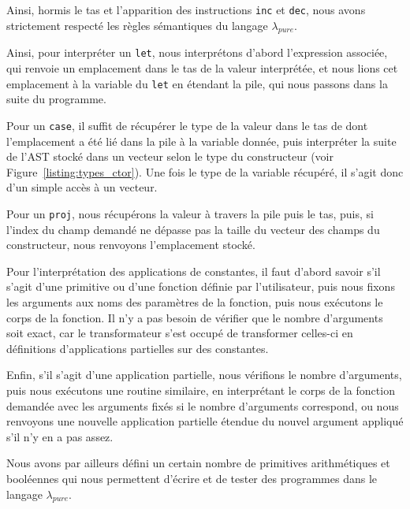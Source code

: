 \documentclass{rapportECL}
\begin{document}
Ainsi, hormis le tas et l'apparition des instructions \verb|inc| et \verb|dec|, nous avons strictement respecté les règles sémantiques du langage $\lambda_{pure}$.

\medskip

Ainsi, pour interpréter un \verb|let|, nous interprétons d'abord l'expression associée, qui renvoie un emplacement dans le tas
de la valeur interprétée, et nous lions cet emplacement à la variable du \verb|let| en étendant la pile, qui nous passons dans 
la suite du programme.

\medskip

Pour un \verb|case|, il suffit de récupérer le type de la valeur dans le tas de dont l'emplacement a été lié dans la pile à la variable 
donnée, puis interpréter la suite de l'AST stocké dans un vecteur selon le type du constructeur (voir Figure~\ref{listing:types_ctor}).
Une fois le type de la variable récupéré, il s'agit donc d'un simple accès à un vecteur.

\medskip

Pour un \verb|proj|, nous récupérons la valeur à travers la pile puis le tas, puis, si l'index du champ demandé ne dépasse pas la 
taille du vecteur des champs du constructeur, nous renvoyons l'emplacement stocké.

\medskip

Pour l'interprétation des applications de constantes, il faut d'abord savoir s'il s'agit d'une primitive ou d'une fonction 
définie par l'utilisateur, puis nous fixons les arguments aux noms des paramètres de la fonction, puis nous exécutons le corps de la fonction.
Il n'y a pas besoin de vérifier que le nombre d'arguments soit exact, car le transformateur s'est occupé de transformer celles-ci
en définitions d'applications partielles sur des constantes.

\medskip

Enfin, s'il s'agit d'une application partielle, nous vérifions le nombre d'arguments, puis nous exécutons une routine similaire,
en interprétant le corps de la fonction demandée avec les arguments fixés si le nombre d'arguments correspond, ou
nous renvoyons une nouvelle application partielle étendue du nouvel argument appliqué s'il n'y en a pas assez.

\bigskip

Nous avons par ailleurs défini un certain nombre de primitives arithmétiques et booléennes qui nous permettent d'écrire et 
de tester des programmes dans le langage $\lambda_{pure}$.
\end{document}
